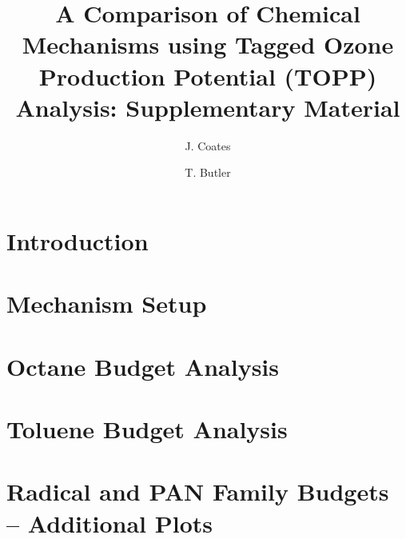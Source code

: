 \documentclass[11pt,a4paper]{article}
\title{A Comparison of Chemical Mechanisms using Tagged Ozone Production Potential (TOPP) Analysis: Supplementary Material}
\author[1]{J. Coates}%
\author[1]{T. Butler}
\affil[1]{Institute for Advanced Sustainability Studies, Potsdam, Germany}
\begin{document}
\maketitle

\section{Introduction} \label{s:introduction}


\section{Mechanism Setup} \label{s:mechanism}


\section{Octane  Budget Analysis} \label{s:octane}


\section{Toluene  Budget Analysis} \label{s:toluene_ho2}


\section{Radical and PAN Family Budgets -- Additional Plots} \label{s:extra_plots}


\newpage


 
\end{document}
